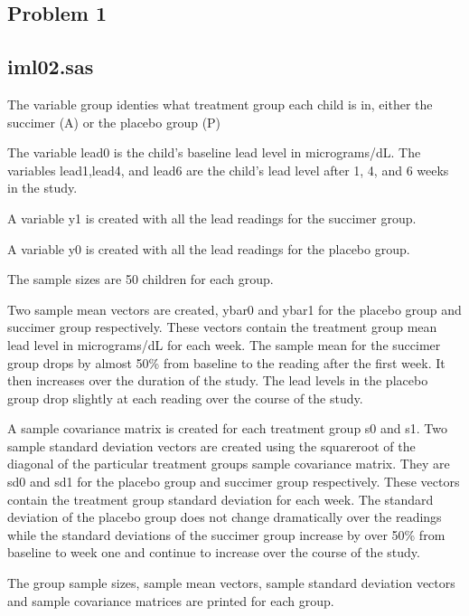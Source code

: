 \documentclass{article}
\begin{document}
\begin{flushleft}

\section*{Problem 1}
\subsection*{iml02.sas}

The variable group identies what treatment group each child is in, either the succimer (A) or the placebo group (P)\medbreak

The variable lead0 is the child's baseline lead level in micrograms/dL. The variables lead1,lead4, and lead6 are the child's lead level after 1, 4, and 6 weeks in the study. \medbreak

A variable y1 is created with all the lead readings for the succimer group. \medbreak

A variable y0 is created with all the lead readings for the placebo group. \medbreak

The sample sizes are 50 children for each group.\medbreak

Two sample mean vectors are created, ybar0 and ybar1 for the placebo group and succimer group respectively. These vectors contain the treatment group mean lead level in micrograms/dL for each week. The sample mean for the succimer group drops by almost 50\% from baseline to the reading after the first week. It then increases over the duration of the study. The lead levels in the placebo group drop slightly at each reading over the course of the study. \medbreak

A sample covariance matrix is created for each treatment group s0 and s1. Two sample standard deviation vectors are created using the squareroot of the diagonal of the particular treatment groups sample covariance matrix. They are sd0 and sd1 for the placebo group and succimer group respectively. These vectors contain the treatment group standard deviation for each week. The standard deviation of the placebo group does not change dramatically over the readings while the standard deviations of the succimer group increase by over 50\% from baseline to week one and continue to increase over the course of the study. \medbreak

The group sample sizes, sample mean vectors, sample standard deviation vectors and sample covariance matrices are printed for each group.


\end{flushleft}
\end{document}
